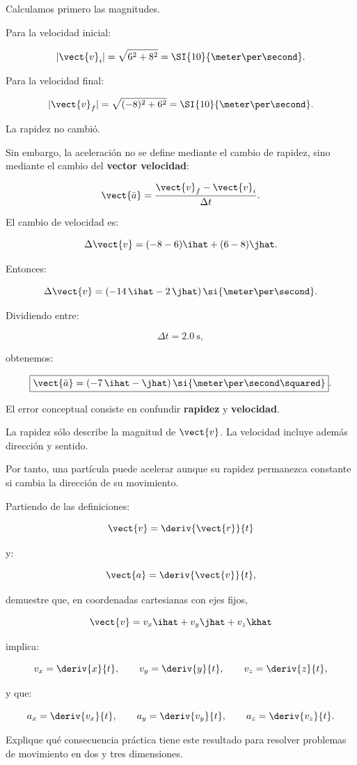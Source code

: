 \begin{explicacion}
Calculamos primero las magnitudes.

Para la velocidad inicial:

\[
|\vect{v}_i|
=
\sqrt{6^2+8^2}
=
\SI{10}{\meter\per\second}.
\]

Para la velocidad final:

\[
|\vect{v}_f|
=
\sqrt{(-8)^2+6^2}
=
\SI{10}{\meter\per\second}.
\]

La rapidez no cambió.

Sin embargo, la aceleración no se define mediante el cambio de rapidez, sino mediante el cambio del \textbf{vector velocidad}:

\[
\vect{\bar{a}}
=
\frac{\vect{v}_f-\vect{v}_i}{\Delta t}.
\]

El cambio de velocidad es:

\[
\Delta\vect{v}
=
(-8-6)\ihat
+
(6-8)\jhat.
\]

Entonces:

\[
\Delta\vect{v}
=
(-14\,\ihat-2\,\jhat)\,
\si{\meter\per\second}.
\]

Dividiendo entre:

\[
\Delta t=\SI{2.0}{\second},
\]

obtenemos:

\[
\boxed{
\vect{\bar{a}}
=
(-7\,\ihat-\jhat)\,
\si{\meter\per\second\squared}
}.
\]

El error conceptual consiste en confundir \textbf{rapidez} y \textbf{velocidad}.

La rapidez sólo describe la magnitud de \(\vect{v}\). La velocidad incluye además dirección y sentido.

Por tanto, una partícula puede acelerar aunque su rapidez permanezca constante si cambia la dirección de su movimiento.
\end{explicacion}


\begin{ejercicio}
Partiendo de las definiciones:

\[
\vect{v}
=
\deriv{\vect{r}}{t}
\]

y:

\[
\vect{a}
=
\deriv{\vect{v}}{t},
\]

demuestre que, en coordenadas cartesianas con ejes fijos,

\[
\vect{v}
=
v_x\ihat+v_y\jhat+v_z\khat
\]

implica:

\[
v_x=\deriv{x}{t},
\qquad
v_y=\deriv{y}{t},
\qquad
v_z=\deriv{z}{t},
\]

y que:

\[
a_x=\deriv{v_x}{t},
\qquad
a_y=\deriv{v_y}{t},
\qquad
a_z=\deriv{v_z}{t}.
\]

Explique qué consecuencia práctica tiene este resultado para resolver problemas de movimiento en dos y tres dimensiones.
\end{ejercicio}

